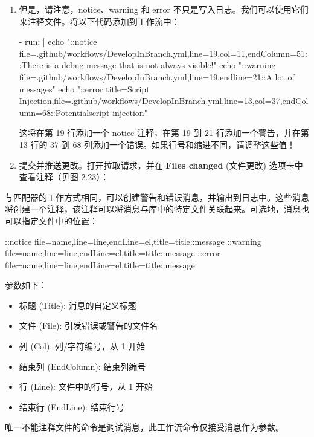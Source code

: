\begin{enumerate}
\item 
但是，请注意，notice、warning 和 error 不只是写入日志。我们可以使用它们来注释文件。将以下代码添加到工作流中：

\begin{shell}
- run: |
  echo "::notice file=.github/workflows/DevelopInBranch.yml,line=19,col=11,endColumn=51::There is a debug message that is not always visible!"
  echo "::warning file=.github/workflows/DevelopInBranch.yml,line=19,endline=21::A lot of messages"
  echo "::error title=Script Injection,file=.github/workflows/DevelopInBranch.yml,line=13,col=37,endColumn=68::Potentialscript injection"
\end{shell}

这将在第 19 行添加一个 notice 注释，在第 19 到 21 行添加一个警告，并在第 13 行的 37 到 68 列添加一个错误。如果行号和缩进不同，请调整这些值！

\item 
提交并推送更改。打开拉取请求，并在 \textbf{Files changed }(文件更改) 选项卡中查看注释（见图 2.23）：

\end{enumerate}


与匹配器的工作方式相同，可以创建警告和错误消息，并输出到日志中。这些消息将创建一个注释，该注释可以将消息与库中的特定文件关联起来。可选地，消息也可以指定文件中的位置：

\begin{shell}
::notice file={name},line={line},endLine={el},title={title}::{message}
::warning
file={name},line={line},endLine={el},title={title}::{message}
::error file={name},line={line},endLine={el},title={title}::{message}
\end{shell}

参数如下：

\begin{itemize}
\item 
标题 (Title): 消息的自定义标题

\item 
文件 (File): 引发错误或警告的文件名

\item 
列 (Col): 列/字符编号，从 1 开始

\item 
结束列 (EndColumn): 结束列编号

\item 
行 (Line): 文件中的行号，从 1 开始

\item 
结束行 (EndLine): 结束行号
\end{itemize}

唯一不能注释文件的命令是调试消息，此工作流命令仅接受消息作为参数。
